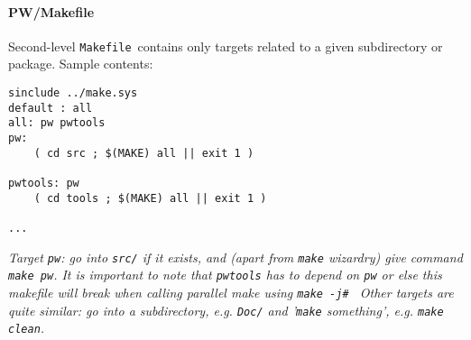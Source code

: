 \documentclass[12pt,a4paper]{article}
\def\Makefile{\texttt{Makefile}}
\begin{document}
\paragraph{PW/Makefile}
Second-level \Makefile\ contains only targets related to a given
subdirectory or package. Sample contents:
\begin{verbatim}
sinclude ../make.sys
default : all
all: pw pwtools
pw:     
    ( cd src ; $(MAKE) all || exit 1 )

pwtools: pw
    ( cd tools ; $(MAKE) all || exit 1 )

...
\end{verbatim}
{\em Target {\tt pw}: go into {\tt src/} if it exists, and (apart 
from \texttt{make} wizardry) give command {\tt make pw}. It is important
to note that {\tt pwtools} has to depend on {\tt pw} or else this
makefile will break when calling parallel make using {\tt make -j\# }
Other targets are quite similar: go into a subdirectory, e.g.
{\tt Doc/} and '{\tt make} something', e.g. {\tt make clean}.}
\end{document}
